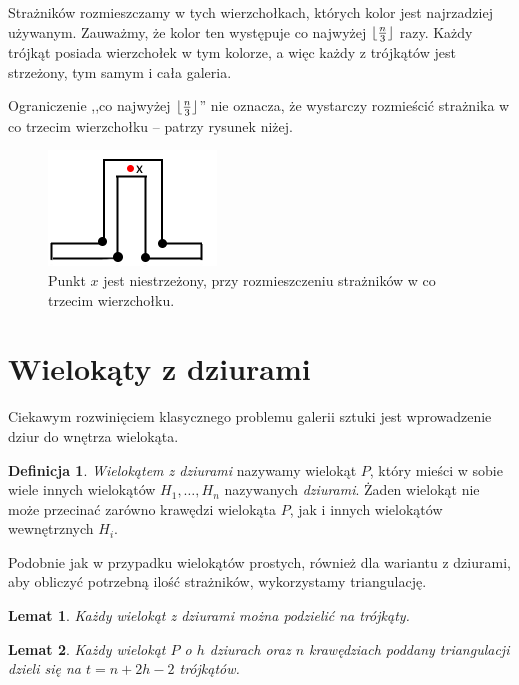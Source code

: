\documentclass{xmgr}
\DeclarePairedDelimiter\floor{\lfloor}{\rfloor}
\newtheorem{Lemat}{Lemat}
\theoremstyle{definition}
\newtheorem{Definicja}{Definicja}
\begin{document}
	Strażników rozmieszczamy w tych wierzchołkach, których kolor jest najrzadziej używanym. Zauważmy, że kolor ten występuje co najwyżej $\floor{\frac{n}{3}}$ razy. Każdy trójkąt posiada wierzchołek w tym kolorze, a więc każdy z trójkątów jest strzeżony, tym samym i cała galeria.

\indent Ograniczenie ,,co najwyżej $\floor{\frac{n}{3}}$'' nie oznacza, że wystarczy rozmieścić strażnika w co trzecim wierzchołku -- patrzy rysunek niżej.
\begin{figure}[ht!]
  \centering
  \includegraphics{rysunki/co_trzeci.png}
  \caption{Punkt $x$ jest niestrzeżony, przy rozmieszczeniu strażników w co trzecim wierzchołku.}
\end{figure} 

\section{Wielokąty z dziurami}
Ciekawym rozwinięciem klasycznego problemu galerii sztuki jest wprowadzenie dziur do wnętrza wielokąta.

\begin{Definicja} \label{def wielokat z dziurami}
  \emph{Wielokątem z dziurami} nazywamy wielokąt $P$, który mieści w sobie wiele innych wielokątów $H_1, \ldots, H_n$ nazywanych \emph{dziurami}. Żaden wielokąt nie może przecinać zarówno krawędzi wielokąta $P$, jak i innych wielokątów wewnętrznych $H_i$.
\end{Definicja}

\indent Podobnie jak w przypadku wielokątów prostych, również dla wariantu z dziurami, aby obliczyć potrzebną ilość strażników, wykorzystamy triangulację.

\begin{Lemat} \cite{orourke}
  Każdy wielokąt z dziurami można podzielić na trójkąty.
\end{Lemat}

\begin{Lemat}\label{t trójkątów triangulacja} \cite{orourke}
  Każdy wielokąt $P$ o $h$ dziurach oraz $n$ krawędziach poddany triangulacji dzieli się na $t = n + 2h-2$ trójkątów.
\end{Lemat}
\end{document}
